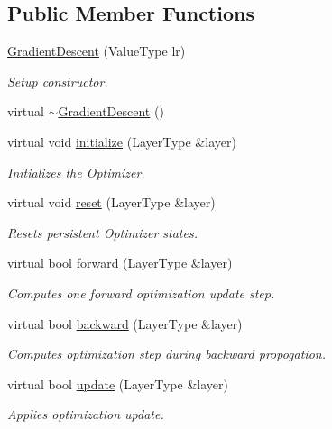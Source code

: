 \subsection*{Public Member Functions}
\begin{DoxyCompactItemize}
\item 
\hyperlink{class_gradient_descent_3_01layer_1_1_fully_connected_3_01_value_type_00_01_options_00_01_extrinsics_01_4_01_4_aca421ed9e1b3baeb5f42ee8f14e74f3d}{Gradient\-Descent} (Value\-Type lr)
\begin{DoxyCompactList}\small\item\em Setup constructor. \end{DoxyCompactList}\item 
virtual \hyperlink{class_gradient_descent_3_01layer_1_1_fully_connected_3_01_value_type_00_01_options_00_01_extrinsics_01_4_01_4_ada9e8975841cec77012eb1270d1dcfbc}{$\sim$\-Gradient\-Descent} ()
\item 
virtual void \hyperlink{class_gradient_descent_3_01layer_1_1_fully_connected_3_01_value_type_00_01_options_00_01_extrinsics_01_4_01_4_aac950e2d0b439f89a5864ae429511d49}{initialize} (Layer\-Type \&layer)
\begin{DoxyCompactList}\small\item\em Initializes the Optimizer. \end{DoxyCompactList}\item 
virtual void \hyperlink{class_gradient_descent_3_01layer_1_1_fully_connected_3_01_value_type_00_01_options_00_01_extrinsics_01_4_01_4_a7891da7fd4190318f223885a5bf32797}{reset} (Layer\-Type \&layer)
\begin{DoxyCompactList}\small\item\em Resets persistent Optimizer states. \end{DoxyCompactList}\item 
virtual bool \hyperlink{class_gradient_descent_3_01layer_1_1_fully_connected_3_01_value_type_00_01_options_00_01_extrinsics_01_4_01_4_a3aa36f05a94531ccd5f27bf640718b4e}{forward} (Layer\-Type \&layer)
\begin{DoxyCompactList}\small\item\em Computes one forward optimization update step. \end{DoxyCompactList}\item 
virtual bool \hyperlink{class_gradient_descent_3_01layer_1_1_fully_connected_3_01_value_type_00_01_options_00_01_extrinsics_01_4_01_4_a781dd142224c6f2221ede05954ba13ec}{backward} (Layer\-Type \&layer)
\begin{DoxyCompactList}\small\item\em Computes optimization step during backward propogation. \end{DoxyCompactList}\item 
virtual bool \hyperlink{class_gradient_descent_3_01layer_1_1_fully_connected_3_01_value_type_00_01_options_00_01_extrinsics_01_4_01_4_a9d52ce6af8abdb9a4bd35fd3a7784ef1}{update} (Layer\-Type \&layer)
\begin{DoxyCompactList}\small\item\em Applies optimization update. \end{DoxyCompactList}\end{DoxyCompactItemize}
